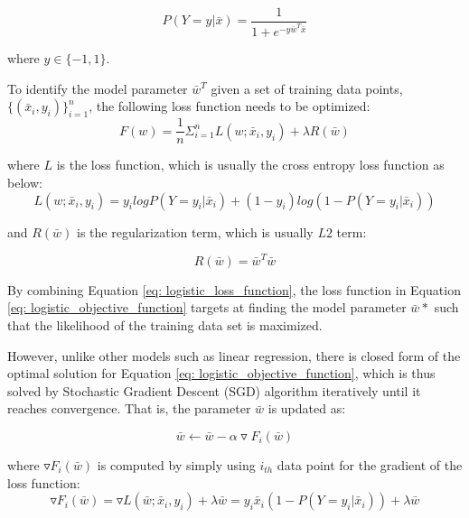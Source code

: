 \begin{equation}\label{eq: logistic_regression_prob}
    P(Y=y|\bar{x}) = \frac{1}{1+e^{-y\bar{w}^T\bar{x}}}
\end{equation}

where $y \in \{-1,1\}$.

To identify the model parameter $\bar{w}^T$ given a set of training data points, $\{(\bar{x}_i, y_i)\}_{i=1}^n$, the following loss function needs to be optimized:
\begin{equation}\label{eq: logistic_objective_function}
    F(w) = \frac{1}{n}\Sigma_{i=1}^nL(w;\bar{x}_i, y_i) + \lambda R(\bar{w})
\end{equation}

where $L$ is the loss function, which is usually the cross entropy loss function as below:
\begin{equation}\label{eq: logistic_loss_function}
    L(w; \bar{x}_i, y_i) = y_ilogP(Y=y_i|\bar{x}_i) + (1-y_i)log(1-P(Y=y_i|\bar{x}_i))
\end{equation}

and $R(\bar{w})$ is the regularization term, which is usually $L2$ term:

\begin{equation}
    R(\bar{w}) = \bar{w}^T\bar{w}
\end{equation}


By combining Equation \ref{eq: logistic_loss_function}, the loss function in Equation \ref{eq: logistic_objective_function} targets at finding the model parameter $\bar{w}*$ such that the likelihood of the training data set is maximized. 

However, unlike other models such as linear regression, there is closed form of the optimal solution for Equation \ref{eq: logistic_objective_function}, which is thus solved by Stochastic Gradient Descent (SGD) algorithm \cite{robert2014machine} iteratively until it reaches convergence. That is, the parameter $\bar{w}$ is updated as:

\begin{equation}
    \bar{w} \leftarrow \bar{w} - \alpha \triangledown F_i(\bar{w})
\end{equation}

where $\triangledown F_i(\bar{w})$ is computed by simply using $i_{th}$ data point for the gradient of the loss function:
\begin{equation}
    \triangledown F_i(\bar{w}) = \triangledown L(\bar{w};\bar{x}_i,y_i) + \lambda \bar{w} = y_i\bar{x}_i(1-P(Y=y_i|\bar{x}_i)) + \lambda \bar{w}
\end{equation}

